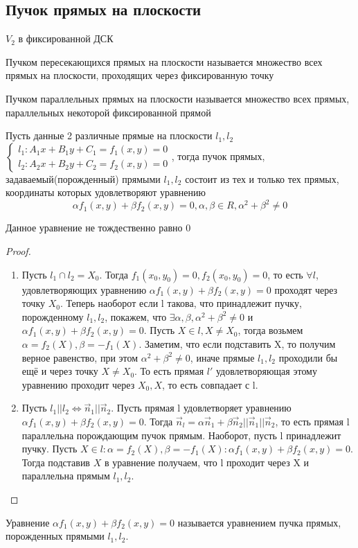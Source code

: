 \subsection{Пучок прямых на плоскости}
\(V_2\) в фиксированной ДСК
\begin{definition}
	Пучком пересекающихся прямых на плоскости называется множество всех прямых на плоскости, проходящих через фиксированную точку
\end{definition}
\begin{definition}
	Пучком параллельных прямых на плоскости называется множество всех прямых, параллельных некоторой фиксированной прямой
\end{definition}
\begin{theorem}
	Пусть данные 2 различные прямые на плоскости \(l_1, l_2\) \(\left\{\begin{gathered}
		l_1: A_1x+B_1y+C_1 = f_1(x,y) = 0 \\
		l_2: A_2x+B_2y+C_2 = f_2(x,y) = 0
	\end{gathered}\right.\), тогда пучок прямых, задаваемый(порожденный) прямыми \(l_1, l_2\) состоит из тех и только тех прямых, координаты которых удовлетворяют уравнению \[\alpha f_1(x,y)+\beta f_2(x,y) = 0, \alpha, \beta\in R, \alpha^2+\beta^2\ne0\]
\end{theorem}
\begin{note}
	Данное уравнение не тождественно равно 0
\end{note}
\begin{proof}
	\begin{enumerate}
		\item Пусть \(l_1 \cap l_2 = X_0\). Тогда \(f_1(x_0,y_0) = 0, f_2(x_0, y_0) = 0\), то есть $\forall l$, удовлетворяющих уравнению \(\alpha f_1(x,y)+\beta f_2(x,y) = 0\) проходят через точку \(X_0\). \newline
		Теперь наоборот если l такова, что принадлежит пучку, порожденному \(l_1, l_2\), покажем, что \(\exists \alpha, \beta, \alpha^2+\beta^2\ne 0\) и \(\alpha f_1(x,y)+\beta f_2(x,y) = 0\). Пусть \(X \in l, X\ne X_0\), тогда возьмем \(\alpha = f_2(X), \beta = -f_1(X)\). Заметим, что если подставить X, то получим верное равенство, при этом \(\alpha^2+\beta^2\ne0\), иначе прямые \(l_1, l_2\) проходили бы ещё и через точку \(X\ne X_0\). То есть прямая \(l'\) удовлетворяющая этому уравнению проходит через \(X_0, X\), то есть совпадает с l.
		\item Пусть \(l_1 || l_2\Longleftrightarrow \vec n_1 || \vec n_2\). Пусть прямая l удовлетворяет уравнению \(\alpha f_1(x,y)+\beta f_2(x,y) = 0.\) Тогда \(\vec n_l = \alpha\vec n_1 + \beta\vec n_2 || \vec n_1 || \vec n_2\), то есть прямая l параллельна порождающим пучок прямым. \newline
		Наоборот, пусть l принадлежит пучку. Пусть \(X\in l:\alpha = f_2(X), \beta = -f_1(X): \alpha f_1(x,y)+\beta f_2(x,y) = 0\). Тогда подставив \(X\) в уравнение получаем, что l проходит через X и параллельна прямым \(l_1, l_2\). 
	\end{enumerate}
\end{proof}
\begin{note}
	Уравнение \(\alpha f_1(x,y)+\beta f_2(x,y) = 0\) называется уравнением пучка прямых, порожденных прямыми \(l_1, l_2\).
\end{note}
